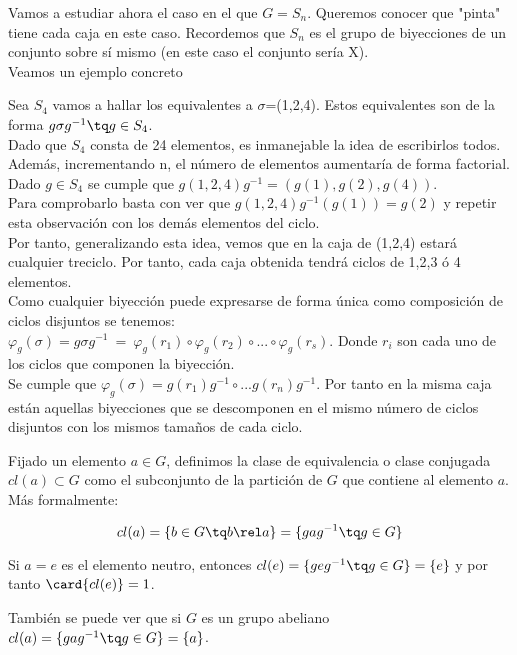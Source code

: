 \documentclass[nochap]{apuntes}
\begin{document}
Vamos a estudiar ahora el caso en el que $G=S_{n}$. Queremos conocer que "pinta" tiene cada caja en este caso. Recordemos que 
$S_{n}$  es el grupo de biyecciones de un conjunto sobre sí mismo (en este caso el conjunto sería X).\\
Veamos un ejemplo concreto
\begin{example}
 Sea $S_{4}$  vamos a hallar los equivalentes a $\sigma$=(1,2,4). Estos equivalentes son de la forma $g\sigma g^{-1} \tq g \in S_{4}$.\\
 Dado que $S_{4}$  consta de 24 elementos, es inmanejable la idea de escribirlos todos. Además, incrementando n, el número de elementos
 aumentaría de forma factorial.\\
 Dado $g\in S_{4}$  se cumple que $g(1,2,4)g^{-1}=(g(1),g(2),g(4))$.\\
 Para comprobarlo basta con ver que $g(1,2,4)g^{-1}(g(1))=g(2)$  y repetir esta observación con los demás elementos del ciclo.\\
 Por tanto, generalizando esta idea, vemos que en la caja de (1,2,4) estará cualquier treciclo. Por tanto, cada caja obtenida tendrá
 ciclos de 1,2,3 ó 4 elementos.\\
 Como cualquier biyección puede expresarse de forma única como composición de ciclos disjuntos se tenemos:\\
 $\varphi_{g}(\sigma)=g\sigma g^{-1}\ = \ \varphi_{g}(r_{1}) \circ \varphi_{g}(r_{2}) \circ ... \circ \varphi_{g}(r_{s})$. Donde $r_{i}$  son cada uno de los
 ciclos que componen la biyección.\\
 Se cumple que $\varphi_{g}(\sigma)=g(r_{1})g^{-1} \circ ... g(r_{n})g^{-1}$.  Por tanto en la misma caja están aquellas biyecciones que se descomponen
 en el mismo número de ciclos disjuntos con los mismos tamaños de cada ciclo.
\end{example}

\begin{defn}
Fijado un elemento $a\in G$, definimos la clase de equivalencia o clase conjugada $cl(a) \subset G$ como el subconjunto de la partición de $G$ que contiene al elemento $a$. Más formalmente:

\[ cl(a) = \{ b \in G \tq b\rel a \} = \{ gag^{-1} \tq g \in G \} \]
\end{defn}

\begin{remark} Si $a = e$ es el elemento neutro, entonces $cl(e) = \{ geg^{-1} \tq g\in G\} = \{ e\} $ y por tanto $\card{cl(e)} = 1$. 

También se puede ver que si $G$ es un grupo abeliano $cl(a) = \{ gag^{-1} \tq g \in G\} = \{ a \}$.
\end{remark}
\end{document}

